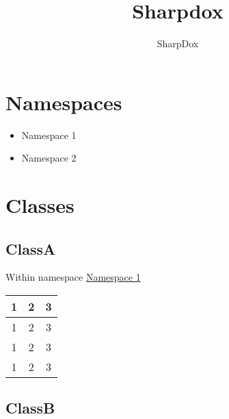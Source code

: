 \documentclass[11pt,a4paper]{article}
\author{SharpDox}
\title{Sharpdox}
\begin{document}
\maketitle
\tableofcontents
\newpage

\section{Namespaces}
\begin{itemize}
\item Namespace 1 \label{ns:1}
\item Namespace 2
\end{itemize}
\section{Classes}
\subsection{ClassA}
Within namespace \hyperref[ns:1]{Namespace 1}

\begin{center}
\begin{tabular}{ccc}
\toprule
1&2&3\\
\midrule
1&2&3\\
1&2&3\\
1&2&3\\
\bottomrule
\end{tabular}
\end{center}
\subsection{ClassB}
\end{document}
